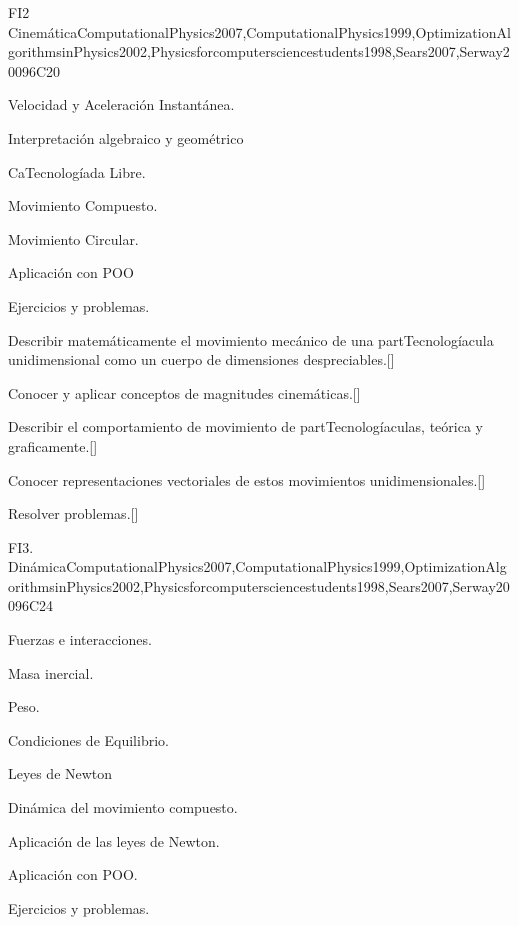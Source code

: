 \begin{syllabus}
\begin{unit}{}{FI2 Cinemática}{ComputationalPhysics2007,ComputationalPhysics1999,OptimizationAlgorithmsinPhysics2002,Physicsforcomputersciencestudents1998,Sears2007,Serway2009}{6}{C20}
\begin{topics}
      \item Velocidad y Aceleración Instantánea.
      \item Interpretación algebraico y geométrico
      \item CaTecnologíada Libre.
      \item Movimiento Compuesto.
      \item Movimiento Circular.
      \item Aplicación con POO
      \item Ejercicios y problemas.
    \end{topics}
   \begin{learningoutcomes}
      \item Describir matemáticamente el movimiento mecánico de una partTecnologíacula unidimensional como un cuerpo de dimensiones despreciables.[\Usage]
      \item Conocer y aplicar conceptos de magnitudes cinemáticas.[\Usage]
      \item Describir el comportamiento de movimiento de partTecnologíaculas, teórica y graficamente.[\Usage]
      \item Conocer representaciones vectoriales de estos movimientos unidimensionales.[\Usage]
      \item Resolver problemas.[\Usage]
   \end{learningoutcomes}
\end{unit}

\begin{unit}{}{FI3. Dinámica}{ComputationalPhysics2007,ComputationalPhysics1999,OptimizationAlgorithmsinPhysics2002,Physicsforcomputersciencestudents1998,Sears2007,Serway2009}{6}{C24}
\begin{topics}
      \item Fuerzas e interacciones.
      \item Masa inercial.
      \item Peso.
      \item Condiciones de Equilibrio.
      \item Leyes de Newton
      \item Dinámica del movimiento compuesto.
      \item Aplicación de las leyes de Newton.
      \item Aplicación con POO.
      \item Ejercicios y problemas.
   \end{topics}


\end{unit}
\end{syllabus}
